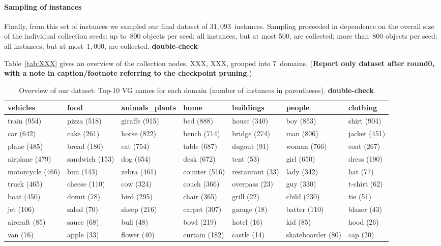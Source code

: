 \paragraph{Sampling of instances}
Finally, from this set of instances we sampled our final dataset of $31,093$~instances. 
Sampling proceeded in dependence on the overall size of the individual collection seeds: 
up to~$800$ objects per seed: all instances, but at most 500, are collected; more than~$800$ objects per seed: all instances, but at most~$1,000$, are collected.  \textbf{double-check}


Table~\ref{tab:XXX} gives an overview of the collection nodes, XXX, XXX, grouped into $7$~domains. (\textbf{Report only dataset after round0, with a note in caption/footnote referring to the checkpoint pruning.})

\begin{table*}
\begin{tabular}{@{~}l@{~}l@{~}l@{~}l@{~}l@{~}l@{~}l}
	\toprule
	          vehicles &            food & animals\_plants &           home &        buildings &             people &      clothing \\
	\midrule
	  train (954) &  pizza (518) &  giraffe (915) &  bed (888) &  house (340) &  boy (853) &  shirt (904) \\
	  car (642) &  cake (261) &  horse (822) &  bench (714) &  bridge (274) &  man (806) &  jacket (451) \\
	  plane (485) &  bread (186) &  cat (754) &  table (687) &  dugout (91) &  woman (766) &  coat (267) \\
	  airplane (479) &  sandwich (153) &  dog (654) &  desk (672) &  tent (53) &  girl (650) &  dress (190) \\
	  motorcycle (466) &  bun (143) &  zebra (461) &  counter (516) &  restaurant (33) &  lady (342) &  hat (77) \\
	  truck (465) &  cheese (110) &  cow (324) &  couch (366) &  overpass (23) &  guy (330) &  t-shirt (62) \\
	 boat (450) &  donut (78) &  bird (295) &  chair (365) &  grill (22) &  child (230) &  tie (51) \\
	  jet (106) &  salad (70) &  sheep (216) &  carpet (307) &  garage (18) &  batter (110) &  blazer (43) \\
	  aircraft (85) &  sauce (68) &  bull (48) &  bowl (219) &  hotel (16) &  kid (85) &  hood (26) \\
	  van (76) &  apple (33) &  flower (40) &  curtain (182) &  castle (14) &  skateboarder (80) &  cap (20) \\
	\bottomrule
\end{tabular}
	\caption{Overview of our dataset: Top-10 VG names for each domain (number of instances in parentheses). \textbf{double-check} \label{tab:overview_dataset1}}
\end{table*}

